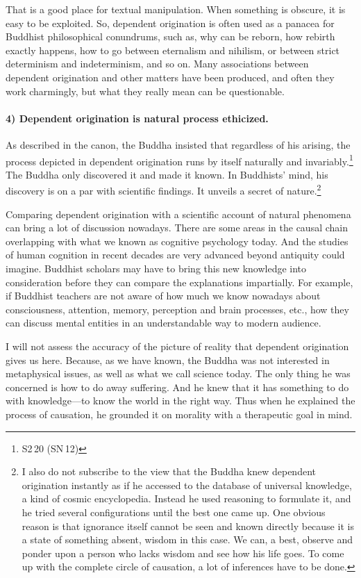 That is a good place for textual manipulation. When something is obscure, it is easy to be exploited. So, dependent origination is often used as a panacea for Buddhist philosophical conundrums, such as, why  can be reborn, how rebirth exactly happens, how to go between eternalism and nihilism, or between strict determinism and indeterminism, and so on. Many associations between dependent origination and other matters have been produced, and often they work charmingly, but what they really mean can be questionable.

\paragraph*{4) Dependent origination is natural process ethicized.}

As described in the canon, the Buddha insisted that regardless of his arising, the process depicted in dependent origination runs by itself naturally and invariably.\footnote{S2\,20 (SN\,12)} The Buddha only discovered it and made it known. In Buddhists' mind, his discovery is on a par with scientific findings. It unveils a secret of nature.\footnote{I also do not subscribe to the view that the Buddha knew dependent origination instantly as if he accessed to the database of universal knowledge, a kind of cosmic encyclopedia. Instead he used reasoning to formulate it, and he tried several configurations until the best one came up. One obvious reason is that ignorance itself cannot be seen and known directly because it is a state of something absent, wisdom in this case. We can, a best, observe and ponder upon a person who lacks wisdom and see how his life goes. To come up with the complete circle of causation, a lot of inferences have to be done.}

Comparing dependent origination with a scientific account of natural phenomena can bring a lot of discussion nowadays. There are some areas in the causal chain overlapping with what we known as cognitive psychology today. And the studies of human cognition in recent decades are very advanced beyond antiquity could imagine. Buddhist scholars may have to bring this new knowledge into consideration before they can compare the explanations impartially. For example, if Buddhist teachers are not aware of how much we know nowadays about consciousness, attention, memory, perception and brain processes, etc., how they can discuss mental entities in an understandable way to modern audience.

I will not assess the accuracy of the picture of reality that dependent origination gives us here. Because, as we have known, the Buddha was not interested in metaphysical issues, as well as what we call science today. The only thing he was concerned is how to do away suffering. And he knew that it has something to do with knowledge---to know the world in the right way. Thus when he explained the process of causation, he grounded it on morality with a therapeutic goal in mind.

